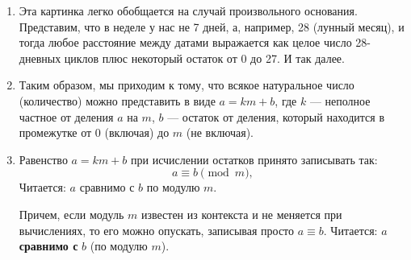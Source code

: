 \begin{enumerate}
\item Эта картинка легко обобщается на случай произвольного основания. Представим, что в неделе у нас не 7 дней, а, например, 28 (лунный месяц), и тогда любое расстояние между датами выражается как целое число 28-дневных циклов плюс некоторый остаток от 0 до 27. И так далее.
\item Таким образом, мы приходим к тому, что всякое натуральное число (количество) можно представить в виде $a=km+b$, где $k$ --- неполное частное от деления $a$ на $m$, $b$ --- остаток от деления, который находится в промежутке от 0 (включая) до $m$ (не включая).
\item Равенство $a=km+b$ при исчислении остатков принято записывать так:
$$
a\equiv b\pmod m,
$$
Читается: $a$ сравнимо с $b$ по модулю $m$.

Причем, если модуль $m$ известен из контекста и не меняется при вычислениях, то его можно опускать, записывая просто $a\equiv b$. Читается: $a$ \textbf{сравнимо с} $b$ (по модулю $m$).


\end{enumerate}
